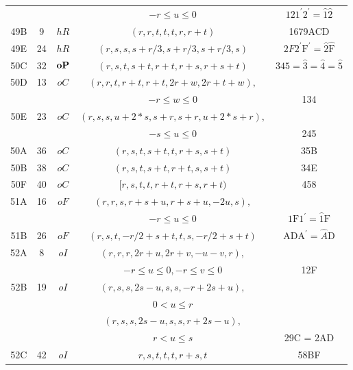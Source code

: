 \documentclass[preprint]{iucr}              %
\numberwithin{equation}{section}
\begin{document}
\begin{table}
\begin{center}
\begin{tabular}{|c|c|c|c|c|}
			&&&$-r \leq u \leq 0$&$121^\prime 2^\prime = \hat{1}\hat{2}$\\
			49B&9&$hR$&$(r,r,t,t,t,r,r+t)$&1679ACD\\
			49E&24&$hR$&$(r,s,s,s+r/3,s+r/3,s+r/3,s)$&$2F2^\prime \text{F}^\prime = \hat{2}\hat{\text{F}}$\\
			\hline
			50C&32&${\bf oP}$&$(r,s,t,s+t,r+t,r+s,r+s+t)$&$345 = \hat{3} = \hat{4} = \hat{5}$\\
			\hline
			50D&13&$oC$&$(r,r,t,r+t,r+t,2r+w,2r+t+w),$&\\
			&&&$-r \leq w \leq 0$&134\\
			50E&23&$oC$&$(r,s,s,u+2*s,s+r,s+r,u+2*s+r),$&\\
			&&&$-s \leq u \leq 0$&245\\
			50A&36&$oC$&$(r,s,t,s+t,t,r+s,s+t)$&35B\\
			50B&38&$oC$&$(r,s,t,s+t,r+t,s,s+t)$&34E\\
			50F&40&$oC$&$[r,s,t,t,r+t,r+s,r+t)$&458\\
			\hline
			51A&16&$oF$&$(r,r,s,r+s+u,r+s+u,-2u,s),$&\\
			&&&$-r \leq u \leq 0$&$\text{1F1}^{\prime} = \hat{1}\text{F}$\\
			51B&26&$oF$&$(r,s,t,-r/2+s+t,t,s,-r/2+s+t)$&$\text{ADA}^{\prime}  = \hat{A}\text{D}$\\
			\hline
			52A&8&$oI$&$(r,r,r,2r+u,2r+v,-u-v,r),$&\\
			&&&$-r \leq u \leq 0, -r \leq v \leq 0$&12F\\
			52B&19&$oI$&$ (r,s,s,2s-u,s,s,-r+2s+u),$&\\
			&&&$0 < u \leq r $&\\
			&&&$ (r,s,s,2s-u,s,s,r+2s-u),$&\\
			&&&$r < u \leq s $&29C = 2AD\\
			52C&42&$oI$&$r,s,t,t,t,r+s,t$&58BF\\
			\hline
		\end{tabular}
	\end{center}
	\label{NiggliFormsI}
\end{table}%
	
\end{document}
